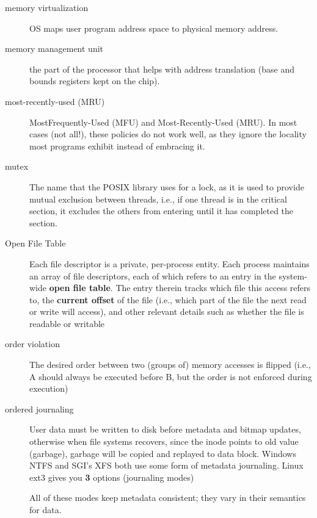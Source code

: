 \begin{description}
\item[memory virtualization] OS maps user program address space to physical memory address.

\item[memory management unit] the part of the processor that helps with address translation (base and bounds registers kept on the chip).

\item[most-recently-used (MRU)] MostFrequently-Used (MFU) and Most-Recently-Used (MRU). In most cases (not all!), these policies do not work well, as they ignore the locality most programs exhibit instead of embracing it.

\item[mutex] The name that the POSIX library uses for a lock, as it is used to provide mutual exclusion between threads, i.e., if one thread is in the critical section, it excludes the others from entering until it has completed the section.

\item[Open File Table] Each file descriptor is a private, per-process entity. Each process maintains an array of file descriptors, each of which refers to an entry in the system-wide \textbf{open file table}. The entry therein tracks which file this access refers to, the \textbf{current offset} of the file (i.e., which part of the file the next read or write will access), and other relevant details such as whether the file is readable or writable

\item[order violation] The desired order between two (groups of) memory accesses is flipped (i.e., A should always be executed before B, but the order is not enforced during execution)

\item[ordered journaling] User data must be written to disk before metadata and bitmap updates, otherwise when file systems recovers, since the inode points to old value (garbage), garbage will be copied and replayed to data block. Windows NTFS and SGI’s XFS both use some form of metadata journaling. Linux ext3 gives you \textbf{3} options (journaling modes)
All of these modes keep metadata consistent; they vary in their semantics for data.


\end{description}
